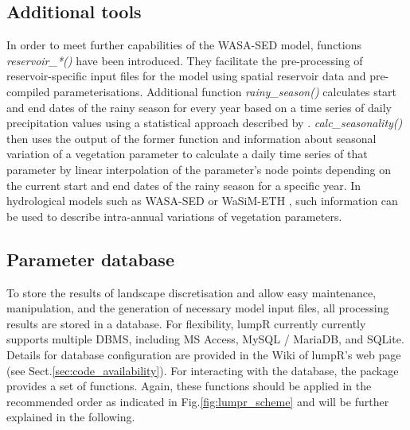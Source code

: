 \subsection{Additional tools}
In order to meet further capabilities of the WASA-SED model, functions \emph{reservoir\_*()} have been introduced.
They facilitate the pre-processing of reservoir-specific input files for the model using spatial reservoir data and pre-compiled parameterisations.
Additional function \emph{rainy\_season()} calculates start and end dates of the rainy season for every year based on a time series of daily precipitation values using a statistical approach described by \citet{Gerstengarbe1999}.
\emph{calc\_seasonality()} then uses the output of the former function and information about seasonal variation of a vegetation parameter to calculate a daily time series of that parameter by linear interpolation of the parameter's node points depending on the current start and end dates of the rainy season for a specific year.
In hydrological models such as WASA-SED or WaSiM-ETH \citep{Schulla2007}, such information can be used to describe intra-annual variations of vegetation parameters.

\subsection{Parameter database}
To store the results of landscape discretisation and allow easy maintenance, manipulation, and the generation of necessary model input files, all processing results are stored in a database. 
For flexibility, lumpR currently currently supports multiple DBMS, including MS Access, MySQL / MariaDB, and SQLite.
Details for database configuration are provided in the Wiki of lumpR's web page (see Sect.\DIFaddbegin \DIFadd{\ }\DIFaddend \ref{sec:code_availability}).
For interacting with the database, the package provides a set of functions.
Again, these functions should be applied in the recommended order as indicated in Fig.\DIFaddbegin \DIFadd{\ }\DIFaddend \ref{fig:lumpr_scheme} and will be further explained in the following.

